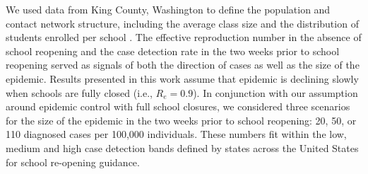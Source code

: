 \documentclass[9pt,twocolumn,twoside,lineno]{pnas-new}
\begin{document}
{We used data from King County, Washington to define the population and contact network structure, including the average class size and the distribution of students enrolled per school \cite{noauthor_report_nodate}. The effective reproduction number in the absence of school reopening and the case detection rate in the two weeks prior to school reopening served as signals of both the direction of cases as well as the size of the epidemic. Results presented in this work assume that epidemic is declining slowly when schools are fully closed (i.e., $R_e = 0.9$). In conjunction with our assumption around epidemic control with full school closures, we considered three scenarios for the size of the epidemic in the two weeks prior to school reopening: 20, 50, or 110 diagnosed cases per 100,000 individuals. These numbers fit within the low, medium and high case detection bands defined by states across the United States for school re-opening guidance.}

\showmatmethods{} %


\showacknow{} %


\end{document}
